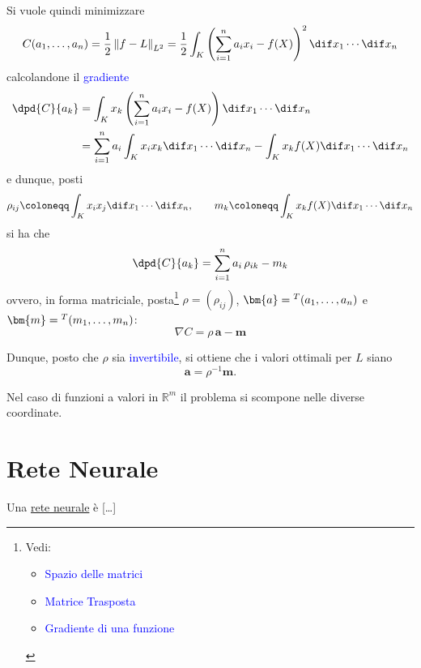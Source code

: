 \documentclass[10pt]{book}
\newcommand{\1}{\mathds{1}}
\newcommand{\R}{\mathds{R}}
\newcommand{\norma}[1]{%
\left\lVert#1\right\rVert%
}
\theoremstyle{definition}%
\theoremstyle{plain}
\theoremstyle{remark}
\renewcommand{\href}[2]{\textcolor{blue}{#2}}
\begin{document}
Si vuole quindi minimizzare
\begin{equation*}
C(a_{1},\dots,a_{n}) = \frac{1}{2}\norma{f-L}_{L^{2}} = \frac{1}{2}\int_{K} \left(\sum_{i=1}^{n} a_{i}x_{i} - f(X)\right)^{2}\dif x_{1}\cdots\dif x_{n}
\end{equation*}
calcolandone il \href{../../../../../org/roam/20250624171244-gradiente_di_una_funzione.org}{gradiente}
\begin{align*}
\dpd{C}{a_{k}} &= \int_{K} x_{k} \left(\sum_{i=1}^{n} a_{i}x_{i} - f(X)\right)\dif x_{1}\cdots\dif x_{n}\\
&= \sum_{i=1}^{n} a_{i} \int_{K} x_{i} x_{k}\dif x_{1}\cdots\dif x_{n} - \int_{K} x_{k} f(X)\dif x_{1}\cdots\dif x_{n}
\end{align*}
e dunque, posti
\begin{equation*}
\rho_{ij} \coloneqq \int_{K} x_{i}x_{j}\dif x_{1}\cdots\dif x_{n},\qquad m_{k} \coloneqq \int_{K} x_{k}f(X)\dif x_{1}\cdots\dif x_{n}
\end{equation*}
si ha che
\begin{equation*}
\dpd{C}{a_{k}} = \sum_{i=1}^{n}a_{i}\,\rho_{ik} - m_{k}
\end{equation*}
ovvero, in forma matriciale, posta\footnote{Vedi:
\begin{itemize}
\item \href{../../../../../org/roam/20250104111539-spazio_delle_matrici.org}{Spazio delle matrici}
\item \href{../../../../../org/roam/20250113144338-matrice_trasposta.org}{Matrice Trasposta}
\item \href{../../../../../org/roam/20250624171244-gradiente_di_una_funzione.org}{Gradiente di una funzione}
\end{itemize}} \(\rho=(\rho_{ij})\), \(\bm{a} = \null^{T}(a_{1},\dots,a_{n})\) e \(\bm{m} = \null^{T}(m_{1},\dots,m_{n})\):
\begin{equation*}
\nabla C = \rho\, \bm{a} - \bm{m}
\end{equation*}

Dunque, posto che \(\rho\) sia \href{../../../../../org/roam/20250104111735-matrice_invertibile.org}{invertibile}, si ottiene che i valori ottimali per \(L\) siano
\begin{equation*}
\bm{a} = \rho^{-1}\bm{m}.
\end{equation*}

Nel caso di funzioni a valori in \(\R^{m}\) il problema si scompone nelle diverse coordinate.
\section{Rete Neurale}
\label{sec:orgb33aaf9}
Una \uline{rete neurale} è [\ldots{}]
\end{document}
